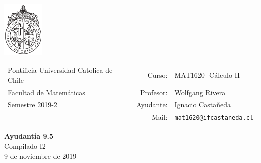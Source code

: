 \documentclass[12pt]{article}
\makeatletter
\newcommand{\ayudantia}{{\sc Ayudantía 9.5}}
\newcommand{\tituloayu}{Compilado I2}
\newcommand{\fecha}{9 de noviembre de 2019}
\newcommand{\sigla}{MAT1620}
\newcommand{\nombre}{Cálculo II}
\newcommand{\profesor}{Wolfgang Rivera}
\newcommand{\ano}{2019}
\newcommand{\semestre}{2}
\newcommand{\mail}{mat1620@ifcastaneda.cl}
\makeatother
\begin{document}
\thispagestyle{empty}

\begin{minipage}{2cm}
	\includegraphics[width=2cm]{../../../../img/logo.pdf}
	\vspace{0.5cm}
\end{minipage}
\begin{minipage}{\linewidth}
	\begin{tabular}{lrl}
		{\scriptsize\sc Pontificia Universidad Catolica de Chile} & \hspace*{0.7in}Curso: &
		\sigla  - \nombre\\
		{\sc Facultad de Matemáticas}&
		Profesor: & \profesor \\
		{\sc Semestre \ano-\semestre} & Ayudante: & {Ignacio Castañeda}\\
		& {Mail:} & \texttt{\mail}
	\end{tabular}
\end{minipage}

\vspace{-10mm}
\begin{center}
	{\LARGE\bf \ayudantia}\\
	\vspace{0.1cm}
	{\tituloayu}\\
	\vspace{0.1cm}
	\fecha\\
	\vspace{0.4cm}
\end{center}
\end{document}
